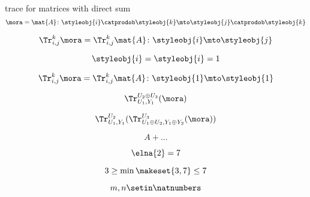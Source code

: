 {\begin{forslides}
        trace for matrices with direct sum
        \begin{equation}
            \label{eq:feedback-006}
            \mora = \mat{A} \colon \styleobj{i} \catprodob \styleobj{k} \mto \styleobj{j} \catprodob \styleobj{k}
        \end{equation}

        \begin{equation}
            \label{eq:feedback-007}
            \Tr_{i,j}^{k} \mora = \Tr_{i,j}^{k} \mat{A} \colon \styleobj{i} \mto \styleobj{j}
        \end{equation}

        \begin{equation}
            \label{eq:feedback-008}
            \styleobj{i} = \styleobj{i} = 1
        \end{equation}

        \begin{equation}
            \label{eq:feedback-009}
            \Tr_{i,j}^{k} \mora = \Tr_{i,j}^{k} \mat{A} \colon \styleobj{1} \mto \styleobj{1}
        \end{equation}

        \begin{equation}
            \label{eq:feedback-010}
            \Tr_{U_1, Y_1}^{U_2 \oplus U_3}(\mora)
        \end{equation}

        \begin{equation}
            \label{eq:feedback-011}
            \Tr_{U_1, Y_1}^{U_2} ( \Tr_{U_1 \oplus U_2, Y_1 \oplus Y_2}^{U_3}(\mora))
        \end{equation}

        \begin{equation}
            \label{eq:feedback-012}
            A +
            .
            ..
        \end{equation}

        \begin{equation}
            \label{eq:feedback-013}
            \elna{2} = 7
        \end{equation}

        \begin{equation}
            \label{eq:feedback-014}
            3 \geq \min \makeset{3, 7} \leq 7
        \end{equation}

        \begin{equation}
            \label{eq:feedback-015}
            m, n \setin \natnumbers
        \end{equation}


\end{forslides}}
